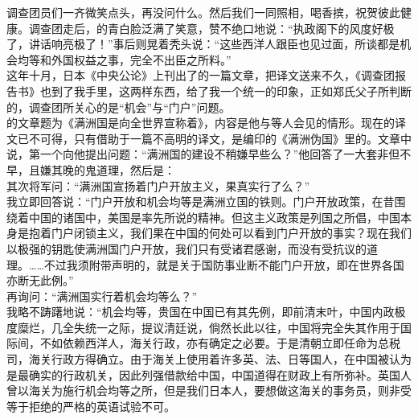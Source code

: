 调查团员们一齐微笑点头，再没问什么。然后我们一同照相，喝香摈，祝贺彼此健康。调查团走后，的青白脸泛满了笑意，赞不绝口地说：“执政阁下的风度好极了，讲话响亮极了！”事后则晃着秃头说：“这些西洋人跟臣也见过面，所谈都是机会均等和外国权益之事，完全不出臣之所料。”\\

这年十月，日本《中央公论》上刊出了的一篇文章，把译文送来不久，《调查团报告书》也到了我手里，这两样东西，给了我一个统一的印象，正如郑氏父子所判断的，调查团所关心的是“机会”与“门户”问题。\\

的文章题为《满洲国是向全世界宣称着》，内容是他与等人会见的情形。现在的译文已不可得，只有借助于一篇不高明的译文，是编印的《满洲伪国》里的。文章中说，第一个向他提出问题：“满洲国的建设不稍嫌早些么？”他回答了一大套非但不早，且嫌其晚的鬼道理，然后是：\\

其次将军问：“满洲国宣扬着门户开放主义，果真实行了么？”\\

我立即回答说：“门户开放和机会均等是满洲立国的铁则。门户开放政策，在昔围绕着中国的诸国中，美国是率先所说的精神。但这主义政策是列国之所倡，中国本身是抱着门户闭锁主义，我们果在中国的何处可以看到门户开放的事实？现在我们以极强的钥匙使满洲国门户开放，我们只有受诸君感谢，而没有受抗议的道理。……不过我须附带声明的，就是关于国防事业断不能门户开放，即在世界各国亦断无此例。”\\

再询问：“满洲国实行着机会均等么？”\\

我略不踌躇地说：“机会均等，贵国在中国已有其先例，即前清末叶，中国内政极度糜烂，几全失统一之际，提议清廷说，倘然长此以往，中国将完全失其作用于国际间，不如依赖西洋人，海关行政，亦有确定之必要。于是清朝立即任命为总税司，海关行政方得确立。由于海关上使用着许多英、法、日等国人，在中国被认为是最确实的行政机关，因此列强借款给中国，中国道得在财政上有所弥补。英国人曾以海关为施行机会均等之所，但是我们日本人，要想做这海关的事务员，则非受等于拒绝的严格的英语试验不可。\\

